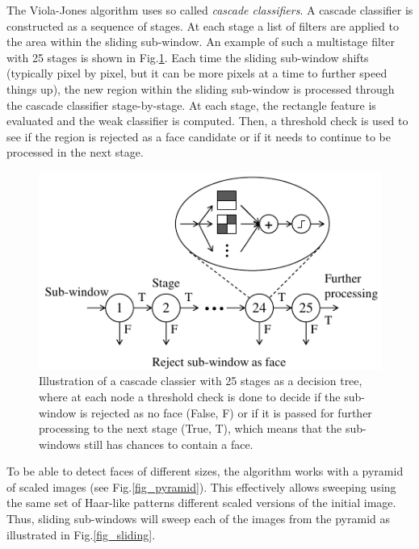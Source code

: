 \documentclass[conference]{IEEEtran}
\begin{document}
The Viola-Jones algorithm uses so called {\it cascade classifiers}. A cascade classifier is constructed as a sequence of stages. At each stage a list of filters are applied to the area within the sliding sub-window. An example of such a multistage filter with 25 stages is shown in Fig.\ref{fig_cascade_classifier}. Each time the sliding sub-window shifts (typically pixel by pixel, but it can be more pixels at a time to further speed things up), the new region within the sliding sub-window is processed through the cascade classifier stage-by-stage. At each stage, the rectangle feature is evaluated and the weak classifier is computed. Then, a threshold check is used to see if the region is rejected as a face candidate or if it needs to continue to be processed in the next stage.


\begin{figure}[!htb]
\centering
	\includegraphics[scale=1.0]{fig_cascade_classifier}
\caption{Illustration of a cascade classier with 25 stages as a decision tree, where at each node a threshold check is done to decide if the sub-window is rejected as no face (False, F) or if it is passed for further processing to the next stage (True, T), which means that the sub-windows still has chances to contain a face.}
\label{fig_cascade_classifier}
\end{figure}


To be able to detect faces of different sizes, the algorithm works with a pyramid of scaled images (see Fig.\ref{fig_pyramid}). This effectively allows sweeping using the same set of Haar-like patterns different scaled versions of the initial image. Thus, sliding sub-windows will sweep each of the images from the pyramid as illustrated in Fig.\ref{fig_sliding}. 
\end{document}
